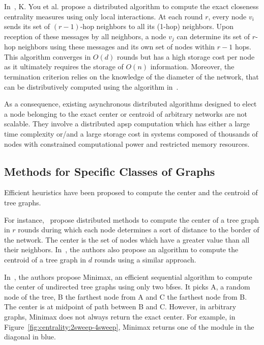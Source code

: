 In~\cite{you2017distributed}, K. You et al. propose a distributed algorithm to compute the exact closeness centrality measures using only local interactions. At each round $r$, every node $v_i$ sends its set of $(r-1)$-hop neighbors to all its (1-hop) neighbors. Upon reception of these messages by all neighbors, a node $v_j$ can determine its set of $r$-hop neighbors using these messages and its own set of nodes within $r-1$ hops. This algorithm converges in $O(d)$ rounds but has a high storage cost per node as it ultimately requires the storage of $O(n)$ information. Moreover, the termination criterion relies on the knowledge of the diameter of the network, that can be distributively computed using the algorithm in~\cite{garin2012distributed}.


As a consequence, existing asynchronous distributed algorithms designed to elect a node belonging to the exact center or centroid of arbitrary networks are not scalable. They involve a distributed \gls{apsp} computation which has either a large time complexity or/and a large storage cost in systems composed of thousands of nodes with constrained computational power and restricted memory resources.

\subsection{Methods for Specific Classes of Graphs}

Efficient heuristics have been proposed to compute the center and the centroid of tree graphs. 

For instance,~\cite{bruell1999self, patterson2014network} propose distributed methods to compute the center of a tree graph in $r$ rounds during which each node determines a sort of distance to the border of the network. The center is the set of nodes which have a greater value than all their neighbors. In~\cite{bruell1999self}, the authors also propose an algorithm to compute the centroid of a tree graph in $d$ rounds using a similar approach.

In~\cite{handler1973minimax}, the authors propose Minimax, an efficient sequential algorithm to compute the center of undirected tree graphs using only two \gls{bfses}. It picks A, a random node of the tree, B the farthest node from A and C the farthest node from B. The center is at midpoint of path between B and C. However, in arbitrary graphs, Minimax does not always return the exact center. For example, in Figure~\ref{fig:centrality:2sweep-4sweep}, Minimax returns one of the module in the diagonal in blue.

